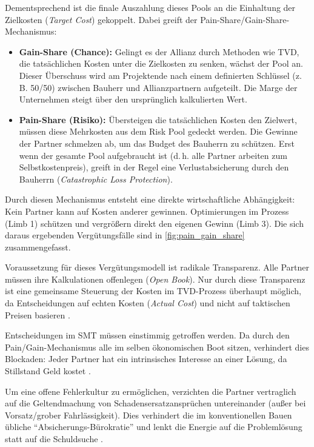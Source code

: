 Dementsprechend ist die finale Auszahlung dieses Pools an die Einhaltung der Zielkosten (\textit{Target Cost}) gekoppelt. Dabei greift der Pain-Share/Gain-Share-Mechanismus:
\begin{itemize}
    \item \textbf{Gain-Share (Chance):} Gelingt es der Allianz durch Methoden wie \acs{TVD}, die tatsächlichen Kosten unter die Zielkosten zu senken, wächst der Pool an. Dieser Überschuss wird am Projektende nach einem definierten Schlüssel (z.\,B. 50/50) zwischen Bauherr und Allianzpartnern aufgeteilt. Die Marge der Unternehmen steigt über den ursprünglich kalkulierten Wert.
    \item \textbf{Pain-Share (Risiko):} Übersteigen die tatsächlichen Kosten den Zielwert, müssen diese Mehrkosten aus dem Risk Pool gedeckt werden. Die Gewinne der Partner schmelzen ab, um das Budget des Bauherrn zu schützen. Erst wenn der gesamte Pool aufgebraucht ist (d.\,h. alle Partner arbeiten zum Selbstkostenpreis), greift in der Regel eine Verlustabsicherung durch den Bauherrn (\textit{Catastrophic Loss Protection}).
\end{itemize}

Durch diesen Mechanismus entsteht eine direkte wirtschaftliche Abhängigkeit: Kein Partner kann auf Kosten anderer gewinnen. Optimierungen im Prozess (Limb 1) schützen und vergrößern direkt den eigenen Gewinn (Limb 3). Die sich daraus ergebenden Vergütungsfälle sind in \cref{fig:pain_gain_share} zusammengefasst.



Voraussetzung für dieses Vergütungsmodell ist radikale Transparenz. Alle Partner müssen ihre Kalkulationen offenlegen (\textit{Open Book}). Nur durch diese Transparenz ist eine gemeinsame Steuerung der Kosten im \acs{TVD}-Prozess überhaupt möglich, da Entscheidungen auf echten Kosten (\textit{Actual Cost}) und nicht auf taktischen Preisen basieren \autocite[Vgl.][S.~9]{bold_integrierte_2022}.

Entscheidungen im \ac{SMT} müssen einstimmig getroffen werden. Da durch den Pain/Gain-Mechanismus alle im selben ökonomischen Boot sitzen, verhindert dies Blockaden: Jeder Partner hat ein intrinsisches Interesse an einer Lösung, da Stillstand Geld kostet \autocite[Vgl.][S.~7]{bold_integrierte_2022}.

Um eine offene Fehlerkultur zu ermöglichen, verzichten die Partner vertraglich auf die Geltendmachung von Schadensersatzansprüchen untereinander (außer bei Vorsatz/grober Fahrlässigkeit). Dies verhindert die im konventionellen Bauen übliche \enquote{Absicherungs-Bürokratie} und lenkt die Energie auf die Problemlösung statt auf die Schuldsuche \autocite[Vgl.][S.~10]{bold_integrierte_2022}.





